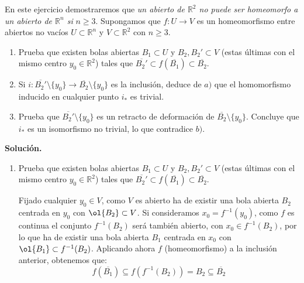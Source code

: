 \begin{ejercicio}
    En este ejercicio demostraremos que \textit{un abierto de $\mathbb{R}^2$ no puede ser homeomorfo a un abierto de $\mathbb{R}^n$ si} $n\geq 3$. Supongamos que $f:U\to V$ es un homeomorfismo entre abiertos no vacíos $U\subset \mathbb{R}^n$ y $V\subset \mathbb{R}^2$ con $n\geq 3$.
    \begin{enumerate}[label=\alph*)]
        \item Prueba que existen bolas abiertas $B_1\subset U$ y $B_2,B_2'\subset V$ (estas últimas con el mismo centro $y_0\in \mathbb{R}^2$) tales que $\overline{B_2'}\subset f(\overline{B_1})\subset \overline{B_2}$.
        \item Si $i:\overline{B_2'}\setminus \{y_0\}\to \overline{B_2}\setminus \{y_0\}$ es la inclusión, deduce de $a)$ que el homomorfismo inducido en cualquier punto $i_\ast$ es trivial.
        \item Prueba que $\overline{B_2'}\setminus \{y_0\}$ es un retracto de deformación de $\overline{B_2}\setminus \{y_0\}$. Concluye que $i_\ast$ es un isomorfismo no trivial, lo que contradice $b)$.
    \end{enumerate}

    \noindent
    \textbf{Solución.}
    \begin{enumerate}[label=\alph*)]
        \item Prueba que existen bolas abiertas $B_1\subset U$ y $B_2,B_2'\subset V$ (estas últimas con el mismo centro $y_0\in \mathbb{R}^2$) tales que $\overline{B_2'}\subset f(\overline{B_1})\subset \overline{B_2}$.

            Fijado cualquier $y_0\in V$, como $V$ es abierto ha de existir una bola abierta $B_2$ centrada en $y_0$ con $\ol{B_2}\subset V$. Si consideramos $x_0 = f^{-1}(y_0)$, como $f$ es continua el conjunto $f^{-1}(B_2)$ será también abierto, con $x_0\in f^{-1}(B_2)$, por lo que ha de existir una bola abierta $B_1$ centrada en $x_0$ con $\ol{B_1}\subset f^{-1}(B_2)$. Aplicando ahora $f$ (homeomorfismo) a la inclusión anterior, obtenemos que:
            \begin{equation*}
                f(\overline{B_1}) \subseteq f(f^{-1}(B_2)) = B_2 \subseteq \overline{B_2}
            \end{equation*}         



\end{enumerate}
\end{ejercicio}
